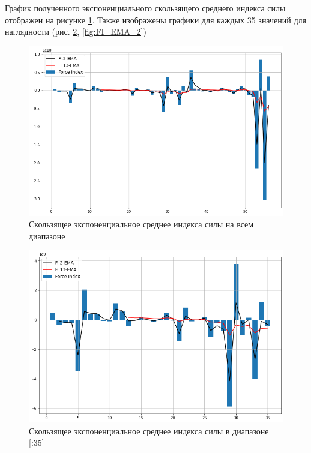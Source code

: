 \documentclass[14pt,a4paper]{extarticle}%
\begin{document}
График полученного экспоненциального скользящего среднего индекса силы
отображен на рисунке \ref{fig:FI_EMA_full}.
Также изображены графики для каждых 35 значений для наглядности
(рис. \ref{fig:FI_EMA_1}, \ref{fig:FI_EMA_2})

\begin{figure}[H]
  \centering
  \includegraphics[scale=0.5]{FI_EMA_full.png}
  \caption{Скользящее экспоненциальное среднее индекса силы на всем диапазоне}
  \label{fig:FI_EMA_full}
\end{figure}

\begin{figure}[H]
  \centering
  \includegraphics[scale=0.5]{FI_EMA_1.png}
  \caption{Скользящее экспоненциальное среднее индекса силы в диапазоне [:35]}
  \label{fig:FI_EMA_1}
\end{figure}
\end{document}
